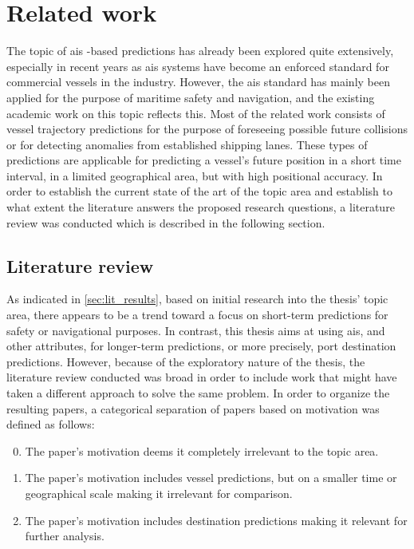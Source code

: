 \chapter{Related work}
\label{chap:related_work}

The topic of \acrfull{ais} -based predictions has already been explored quite extensively, especially in recent years as \acrshort{ais} systems have become an enforced standard for commercial vessels in the industry. However, the \acrshort{ais} standard has mainly been applied for the purpose of maritime safety and navigation, and the existing academic work on this topic reflects this. Most of the related work consists of vessel trajectory predictions for the purpose of foreseeing possible future collisions or for detecting anomalies from established shipping lanes. These types of predictions are applicable for predicting a vessel's future position in a short time interval, in a limited geographical area, but with high positional accuracy. In order to establish the current state of the art of the topic area and establish to what extent the literature answers the proposed research questions, a literature review was conducted which is described in the following section.

\section{Literature review}
\label{sec:lit_review}

As indicated in \cref{sec:lit_results}, based on initial research into the thesis' topic area, there appears to be a trend toward a focus on short-term predictions for safety or navigational purposes. In contrast, this thesis aims at using \acrshort{ais}, and other attributes, for longer-term predictions, or more precisely, port destination predictions. However, because of the exploratory nature of the thesis, the literature review conducted was broad in order to include work that might have taken a different approach to solve the same problem. In order to organize the resulting papers, a categorical separation of papers based on motivation was defined as follows:

\begin{enumerate}
\setcounter{enumi}{-1}
    \item The paper's motivation deems it completely irrelevant to the topic area.
    \item The paper's motivation includes vessel predictions, but on a smaller time or geographical scale making it irrelevant for comparison.
    \item The paper's motivation includes destination predictions making it relevant for further analysis.
\end{enumerate}

